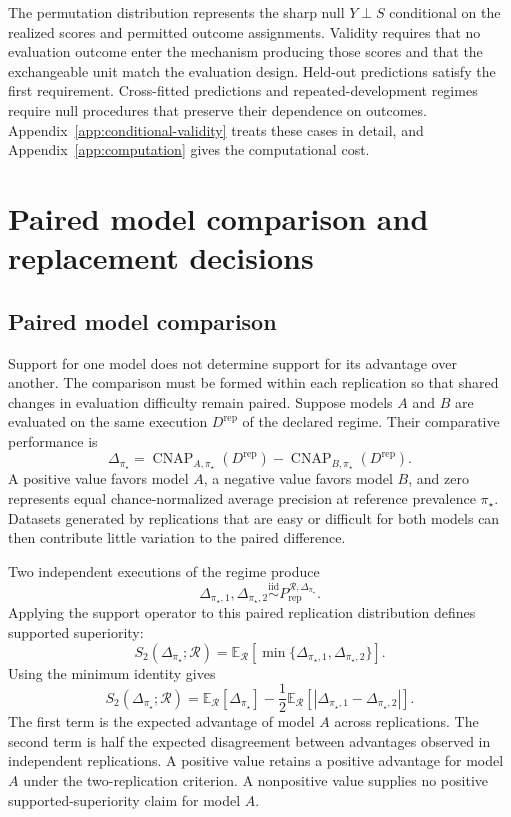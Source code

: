 \documentclass[11pt]{article}
\newcommand{\CNAP}{\operatorname{CNAP}}
\newcommand{\Regime}{\mathcal{R}}
\newcommand{\E}{\mathbb{E}}
\newcommand{\iid}{\mathrel{\overset{\mathrm{iid}}{\sim}}}
\theoremstyle{remark}
\begin{document}
The permutation distribution represents the sharp null $Y\perp S$ conditional on the realized scores and permitted outcome assignments. Validity requires that no evaluation outcome enter the mechanism producing those scores and that the exchangeable unit match the evaluation design. Held-out predictions satisfy the first requirement. Cross-fitted predictions and repeated-development regimes require null procedures that preserve their dependence on outcomes. Appendix~\ref{app:conditional-validity} treats these cases in detail, and Appendix~\ref{app:computation} gives the computational cost.

\section{Paired model comparison and replacement decisions}
\label{sec:paired}

\subsection{Paired model comparison}

Support for one model does not determine support for its advantage over another. The comparison must be formed within each replication so that shared changes in evaluation difficulty remain paired. Suppose models $A$ and $B$ are evaluated on the same execution $D^{\mathrm{rep}}$ of the declared regime. Their comparative performance is
\begin{equation}
\Delta_{\pi_\star}
=
\CNAP_{A,\pi_\star}(D^{\mathrm{rep}})
-
\CNAP_{B,\pi_\star}(D^{\mathrm{rep}}).
\label{eq:paired-difference}
\end{equation}
A positive value favors model $A$, a negative value favors model $B$, and zero represents equal chance-normalized average precision at reference prevalence $\pi_\star$. Datasets generated by replications that are easy or difficult for both models can then contribute little variation to the paired difference.

Two independent executions of the regime produce
\[
\Delta_{\pi_\star,1},
\Delta_{\pi_\star,2}
\iid
P_{\mathrm{rep}}^{\Regime,\Delta_{\pi_\star}}.
\]
Applying the support operator to this paired replication distribution defines supported superiority:
\begin{equation}
S_2(\Delta_{\pi_\star};\Regime)
=
\E_{\Regime}
\left[
\min\{
\Delta_{\pi_\star,1},
\Delta_{\pi_\star,2}
\}
\right].
\label{eq:paired}
\end{equation}
Using the minimum identity gives
\begin{equation}
S_2(\Delta_{\pi_\star};\Regime)
=
\E_{\Regime}[\Delta_{\pi_\star}]
-
\frac12
\E_{\Regime}
\left[
|\Delta_{\pi_\star,1}-\Delta_{\pi_\star,2}|
\right].
\label{eq:paired-decomposition}
\end{equation}
The first term is the expected advantage of model $A$ across replications. The second term is half the expected disagreement between advantages observed in independent replications. A positive value retains a positive advantage for model $A$ under the two-replication criterion. A nonpositive value supplies no positive supported-superiority claim for model $A$.
\end{document}
